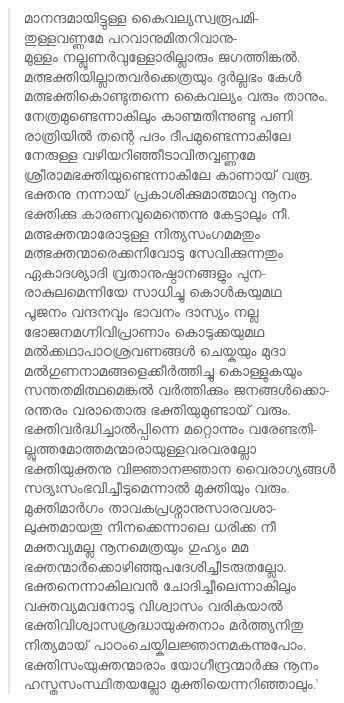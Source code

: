 \begin{verse}
മാനന്ദമായിട്ടുള്ള കൈവല്യസ്വരൂപമി-\\
തുള്ളവണ്ണമേ പറവാനുമിതറിവാനു-\\
മുള്ളം നല്ലുണര്‍വുള്ളോരില്ലാരും ജഗത്തിങ്കല്‍.\\
മത്ഭക്തിയില്ലാതവര്‍ക്കെത്രയും ദുര്‍ല്ലഭം കേള്‍\\
മത്ഭക്തികൊണ്ടുതന്നെ കൈവല്യം വരും താനും.\\
നേത്രമുണ്ടെന്നാകിലും കാണ്മതിന്നുണ്ടു പണി\\
രാത്രിയില്‍ തന്റെ പദം ദീപമുണ്ടെന്നാകിലേ\\
നേരുള്ള വഴിയറിഞ്ഞീടാവിതവ്വണ്ണമേ\\
ശ്രീരാമഭക്തിയുണ്ടെന്നാകിലേ കാണായ് വരൂ.\\
ഭക്തനു നന്നായ് പ്രകാശിക്കുമാത്മാവു നൂനം\\
ഭക്തിക്കു കാരണവുമെന്തെന്നു കേട്ടാലും നീ.\\
മത്ഭക്തന്മാരോടുള്ള നിത്യസംഗമമതും\\
മത്ഭക്തന്മാരെക്കനിവോടു സേവിക്കുന്നതും\\
ഏകാദശ്യാദി വ്രതാനുഷ്ഠാനങ്ങളും പുന-\\
രാകുലമെന്നിയേ സാധിച്ചു കൊള്‍കയുമഥ\\
പൂജനം വന്ദനവും ഭാവനം ദാസ്യം നല്ല\\
ഭോജനമഗ്നിവിപ്രാണാം കൊടുക്കയുമഥ\\
മല്‍ക്കഥാപാഠശ്രവണങ്ങള്‍ ചെയ്കയും മുദാ\\
മല്‍ഗുണനാമങ്ങളെക്കീര്‍ത്തിച്ചു കൊള്ളുകയും\\
സന്തതമിത്ഥമെങ്കല്‍ വര്‍ത്തിക്കും ജനങ്ങള്‍ക്കൊ-\\
രന്തരം വരാതൊരു ഭക്തിയുമുണ്ടായ് വരും.\\
ഭക്തിവര്‍ദ്ധിച്ചാല്‍പ്പിന്നെ മറ്റൊന്നും വരേണ്ടതി-\\
ല്ലുത്തമോത്തമന്മാരായുള്ളവരവരല്ലോ\\
ഭക്തിയുക്തനു വിജ്ഞാനജ്ഞാന വൈരാഗ്യങ്ങള്‍\\
സദ്യഃസംഭവിച്ചീടുമെന്നാല്‍ മുക്തിയും വരും.\\
മുക്തിമാര്‍ഗം താവകപ്രശ്നാനുസാരവശാ-\\
ലുക്തമായതു നിനക്കെന്നാലെ ധരിക്ക നീ\\
മക്തവ്യമല്ല നൂനമെത്രയും ഗുഹ്യം മമ\\
ഭക്തന്മാര്‍ക്കൊഴിഞ്ഞുപദേശിച്ചീടരുതല്ലോ.\\
ഭക്തനെന്നാകിലവന്‍ ചോദിച്ചീലെന്നാകിലും\\
വക്തവ്യമവനോടു വിശ്വാസം വരികയാല്‍\\
ഭക്തിവിശ്വാസശ്രദ്ധായുക്തനാം മര്‍ത്ത്യനിതു\\
നിത്യമായ് പാഠംചെയ്കിലജ്ഞാനമകന്നുപോം.\\
ഭക്തിസംയുക്തന്മാരാം യോഗീന്ദ്രന്മാര്‍ക്കു നൂനം\\
ഹസ്തസംസ്ഥിതയല്ലോ മുക്തിയെന്നറിഞ്ഞാലും.’
\end{verse}

